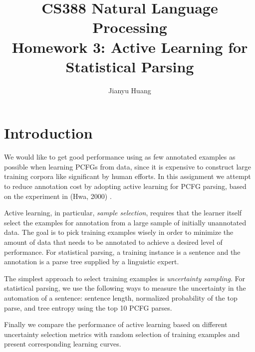 \documentclass[winfonts,UTF8]{article}
\begin{document}
    \title{CS388 Natural Language Processing\\Homework 3: Active Learning for Statistical Parsing}
    \author{Jianyu Huang}
    \maketitle

    
\section{Introduction}

We would like to get good performance using as few annotated examples as possible when learning PCFGs from data, since it is expensive to construct large training corpora like significant by human efforts. In this assignment we attempt to reduce annotation cost by adopting active learning for PCFG parsing, based on the experiment in  (Hwa, 2000) \cite{hwa2000sample}.

Active learning, in particular, \emph{sample selection}, requires that the learner itself select the examples for annotation from a large sample of initially unannotated data. The goal is to pick training examples wisely in order to minimize the amount of data that needs to be annotated to achieve a desired level of performance. For statistical parsing, a training instance is a sentence and the annotation is a parse tree supplied by a linguistic expert.

The simplest approach to select training examples is \emph{uncertainty sampling}. For statistical parsing, we use the following ways to measure the uncertainty in the automation of a sentence: sentence length, normalized probability of the top parse, and tree entropy using the top 10 PCFG parses.

Finally we compare the performance of active learning based on different uncertainty selection metrics with random selection of training examples and present corresponding learning curves.
\end{document}
